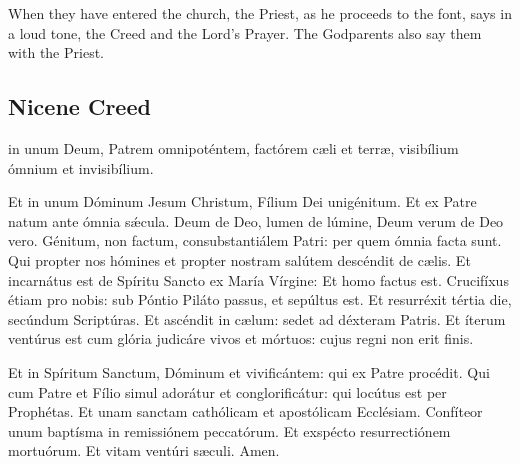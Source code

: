 \clearpage
\begin{rubric}
	When they have entered the church, the Priest, as he proceeds to the font, says in a loud tone, the Creed and the Lord's Prayer. The Godparents also say them with the Priest.
\end{rubric}

\vspace{-0.6\baselineskip}

\subsection{Nicene Creed}

\vspace{-0.1\baselineskip}

    { in unum Deum, Patrem omnipoténtem, factórem c{\ae}li et terr{\ae}, visibílium ómnium et invisibílium.\par
    Et in unum Dóminum Jesum Christum, Fílium Dei unigénitum. Et ex Patre natum ante ómnia sǽcula. Deum de Deo, lumen de lúmine, Deum verum de Deo vero. Génitum, non factum, consubstantiálem Patri: per quem ómnia facta sunt. Qui propter nos hómines et propter nostram salútem descéndit de c{\ae}lis. Et incarnátus est de Spíritu Sancto ex María Vírgine: Et homo factus est. Crucifíxus étiam pro nobis: sub Póntio Piláto passus, et sepúltus est. Et resurréxit tértia die, secúndum Scriptúras. Et ascéndit in c{\ae}lum: sedet ad déxteram Patris. Et íterum ventúrus est cum glória judicáre vivos et mórtuos: cujus regni non erit finis.\par
    Et in Spíritum Sanctum, Dóminum et vivificántem: qui ex Patre procédit. Qui cum Patre et Fílio simul adorátur et conglorificátur: qui locútus est per Prophétas. Et unam sanctam cathólicam et apostólicam Ecclésiam. Confíteor unum baptísma in remissiónem peccatórum. Et exspécto resurrectiónem mortuórum. {} Et vitam ventúri s{\ae}culi. Amen.}
    

